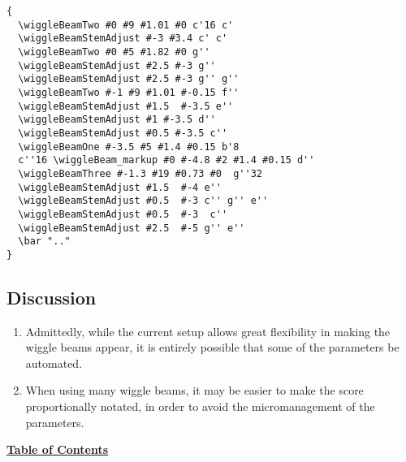 \begin{verbatim}
{
  \wiggleBeamTwo #0 #9 #1.01 #0 c'16 c'
  \wiggleBeamStemAdjust #-3 #3.4 c' c'
  \wiggleBeamTwo #0 #5 #1.82 #0 g''
  \wiggleBeamStemAdjust #2.5 #-3 g''
  \wiggleBeamStemAdjust #2.5 #-3 g'' g''
  \wiggleBeamTwo #-1 #9 #1.01 #-0.15 f''
  \wiggleBeamStemAdjust #1.5  #-3.5 e''
  \wiggleBeamStemAdjust #1 #-3.5 d''
  \wiggleBeamStemAdjust #0.5 #-3.5 c''
  \wiggleBeamOne #-3.5 #5 #1.4 #0.15 b'8 
  c''16 \wiggleBeam_markup #0 #-4.8 #2 #1.4 #0.15 d''
  \wiggleBeamThree #-1.3 #19 #0.73 #0  g''32
  \wiggleBeamStemAdjust #1.5  #-4 e''
  \wiggleBeamStemAdjust #0.5  #-3 c'' g'' e''
  \wiggleBeamStemAdjust #0.5  #-3  c''
  \wiggleBeamStemAdjust #2.5  #-5 g'' e''
  \bar ".."
}
\end{verbatim}
\vfill \break

\subsection{Discussion}
\begin{enumerate}
\item Admittedly, while the current setup allows great flexibility in making the wiggle beams appear, it is entirely possible that some of the parameters be automated. 
\item When using many wiggle beams, it may be easier to make the score proportionally notated, in order to avoid the micromanagement of the parameters. 
\end{enumerate}
\break
\break
\hyperref[sec:toc]{\textbf{Table of Contents}}
